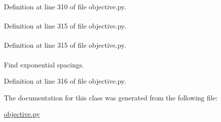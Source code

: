 \-Definition at line 310 of file objective.\-py.

\hypertarget{classforcebalance_1_1objective_1_1Penalty_a205b8adaf51199f59e18785806ffc567}{
\paragraph[{\-Pen\-\_\-\-Tab}]{}}\label{classforcebalance_1_1objective_1_1Penalty_a205b8adaf51199f59e18785806ffc567}


\-Definition at line 315 of file objective.\-py.

\hypertarget{classforcebalance_1_1objective_1_1Penalty_a8d4f7ac9e3dcd3a55fc2f175ee100a98}{
\paragraph[{ptyp}]{}}\label{classforcebalance_1_1objective_1_1Penalty_a8d4f7ac9e3dcd3a55fc2f175ee100a98}


\-Definition at line 315 of file objective.\-py.

\hypertarget{classforcebalance_1_1objective_1_1Penalty_a8faf40a164789edd6c5b6863892abef4}{
\paragraph[{spacings}]{}}\label{classforcebalance_1_1objective_1_1Penalty_a8faf40a164789edd6c5b6863892abef4}


\-Find exponential spacings. 



\-Definition at line 316 of file objective.\-py.



\-The documentation for this class was generated from the following file\-:\begin{DoxyCompactItemize}
\item 
\hyperlink{objective_8py}{objective.\-py}\end{DoxyCompactItemize}

